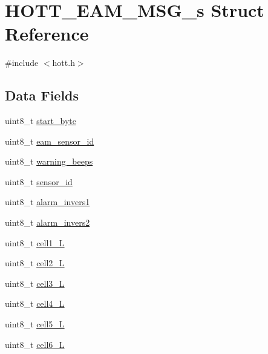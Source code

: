 \hypertarget{structHOTT__EAM__MSG__s}{\section{H\+O\+T\+T\+\_\+\+E\+A\+M\+\_\+\+M\+S\+G\+\_\+s Struct Reference}
\label{structHOTT__EAM__MSG__s}
}


{\ttfamily \#include $<$hott.\+h$>$}

\subsection*{Data Fields}
\begin{DoxyCompactItemize}
\item 
uint8\+\_\+t \hyperlink{structHOTT__EAM__MSG__s_a9988b964181d261e0398354bdf4a8dc7}{start\+\_\+byte}
\item 
uint8\+\_\+t \hyperlink{structHOTT__EAM__MSG__s_a56393744b8c7a6e5802180866f0b073b}{eam\+\_\+sensor\+\_\+id}
\item 
uint8\+\_\+t \hyperlink{structHOTT__EAM__MSG__s_aa6ccdc16a41b8fc95220095b44c218f4}{warning\+\_\+beeps}
\item 
uint8\+\_\+t \hyperlink{structHOTT__EAM__MSG__s_ad290bab33390199fa46b23e48850fa3a}{sensor\+\_\+id}
\item 
uint8\+\_\+t \hyperlink{structHOTT__EAM__MSG__s_a1d04ad88d6476694f09931369925ca2c}{alarm\+\_\+invers1}
\item 
uint8\+\_\+t \hyperlink{structHOTT__EAM__MSG__s_add808dd5965aaa48e3281b03d2581dd1}{alarm\+\_\+invers2}
\item 
uint8\+\_\+t \hyperlink{structHOTT__EAM__MSG__s_a13b6780cb909bb6f76bbcff700ad121f}{cell1\+\_\+\+L}
\item 
uint8\+\_\+t \hyperlink{structHOTT__EAM__MSG__s_a5f6795c97ce111260c108e84a31152b9}{cell2\+\_\+\+L}
\item 
uint8\+\_\+t \hyperlink{structHOTT__EAM__MSG__s_a5f865a4b16989784fe3bc26d4070e20c}{cell3\+\_\+\+L}
\item 
uint8\+\_\+t \hyperlink{structHOTT__EAM__MSG__s_a238b15e3ec5e405118adbecf09161346}{cell4\+\_\+\+L}
\item 
uint8\+\_\+t \hyperlink{structHOTT__EAM__MSG__s_a0dd7ee12d2c7e6f2796892e9892c4c53}{cell5\+\_\+\+L}
\item 
uint8\+\_\+t \hyperlink{structHOTT__EAM__MSG__s_af04cdb0ef41c2e4dcac083003f63513a}{cell6\+\_\+\+L}
\item 

\end{DoxyCompactItemize}

